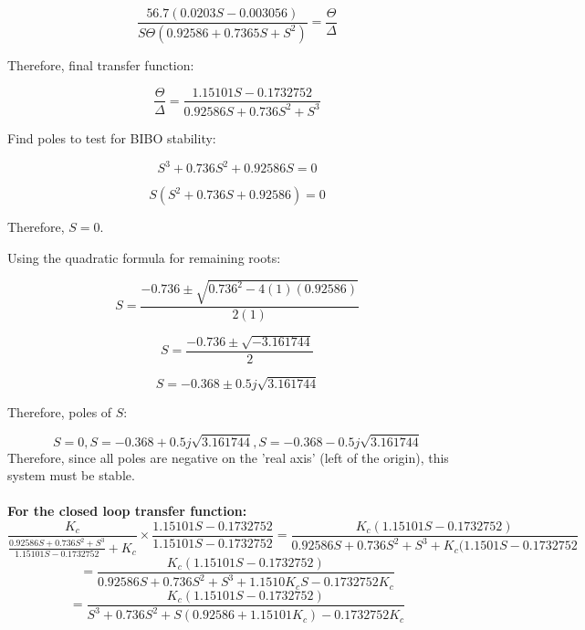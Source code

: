 \documentclass{article}
\numberwithin{equation}{section}
\begin{document}
\begin{equation}
\frac{56.7(0.0203S - 0.003056)}{S\Theta(0.92586 + 0.7365S + S^2)} = \frac{\Theta}{\Delta}
\end{equation}

Therefore, final transfer function:

\begin{equation}
\frac{\Theta}{\Delta} = \frac{1.15101S - 0.1732752}{0.92586S + 0.736S^2 + S^3}
\end{equation}

Find poles to test for BIBO stability:

\begin{equation}
S^3 + 0.736S^2 + 0.92586S = 0
\end{equation}

\begin{equation}
S(S^2 + 0.736S + 0.92586) = 0
\end{equation}

Therefore, \(S = 0\).

Using the quadratic formula for remaining roots:

\begin{equation}
S = \frac{-0.736 \pm \sqrt{0.736^2 - 4(1)(0.92586)}}{2(1)}
\end{equation}

\begin{equation}
S = \frac{-0.736 \pm \sqrt{-3.161744}}{2}
\end{equation}

\begin{equation}
S = -0.368 \pm 0.5j \sqrt{3.161744}
\end{equation}

Therefore, poles of \(S\):

\begin{equation}
S = 0, S= -0.368 + 0.5j \sqrt{3.161744}, S = -0.368 - 0.5j \sqrt{3.161744}
\end{equation}
Therefore, since all poles are negative on the 'real axis' (left of the origin), this system must be stable.\\\\
\textbf{For the closed loop transfer function:}
\begin{equation}
    \frac{K_c}{\frac{0.92586S + 0.736S^2 + S^3}{1.15101S - 0.1732752} + K_c} \times \frac{1.15101S - 0.1732752}{1.15101S - 0.1732752}
    = \frac{K_c (1.15101S - 0.1732752)}{0.92586S + 0.736S^2 + S^3 + K_c(1.1501S - 0.1732752}
\end{equation}
\begin{equation}
    = \frac{K_c (1.15101S - 0.1732752)}{0.92586S + 0.736S^2 + S^3 + 1.1510K_c S - 0.1732752K_c}
\end{equation}
\begin{equation}
     = \frac{K_c (1.15101S - 0.1732752)}{S^3 + 0.736S^2 + S(0.92586+1.15101K_c) - 0.1732752K_c}
\end{equation}
\end{document}
